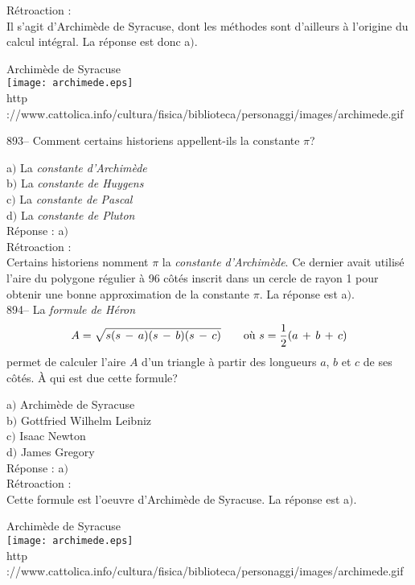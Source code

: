 ﻿\documentclass[letterpaper, 12pt]{article}
\begin{document}
R\'etroaction : \\
Il s'agit d'Archim\`ede de Syracuse, dont les m\'ethodes sont d'ailleurs \`a
l'origine du calcul int\'egral. La r\'eponse est donc a$)$.\\

        \begin{center}
        Archim\`ede de Syracuse\\
    \texttt{[image: archimede.eps]}\\
        {\footnotesize http
://www.cattolica.info/cultura/fisica/biblioteca/personaggi/images/archimede.gif}
    \end{center}

893-- Comment certains historiens appellent-ils la constante $\pi$?

a$)$ La {\sl constante d'Archim\`ede} \\
b$)$ La {\sl constante de Huygens} \\
c$)$ La {\sl constante de Pascal} \\
d$)$ La {\sl constante de Pluton} \\

R\'eponse : a$)$\\

R\'etroaction : \\
Certains historiens nomment $\pi$ la {\sl constante d'Archim\`ede}.
Ce dernier avait utilis\'e l'aire du polygone r\'egulier
\`a 96 c\^ot\'es inscrit dans un cercle de rayon 1 pour obtenir une bonne
approximation de la constante $\pi$. La r\'eponse est a$)$.\\

894-- La {\sl formule de H\'eron}
$$A=\sqrt{s(s\,-\,a)(s\,-\,b)(s\,-\,c)}\hskip 20 pt \text{o\`u }
s=\displaystyle\frac12(a\,+\,b\,+\,c)$$
permet de calculer l'aire $A$ d'un triangle \`a partir des longueurs
$a$, $b$ et $c$ de ses c\^ot\'es. \`A qui est due cette formule?

a$)$ Archim\`ede de Syracuse \\
b$)$ Gottfried Wilhelm Leibniz \\
c$)$ Isaac Newton \\
d$)$ James Gregory \\

R\'eponse : a$)$\\

R\'etroaction : \\
Cette formule est l'oeuvre d'Archim\`ede de Syracuse. La r\'eponse
est a$)$.

        \begin{center}
        Archim\`ede de Syracuse\\
    \texttt{[image: archimede.eps]}\\
        {\footnotesize http
://www.cattolica.info/cultura/fisica/biblioteca/personaggi/images/archimede.gif}
    \end{center}
\end{document}
